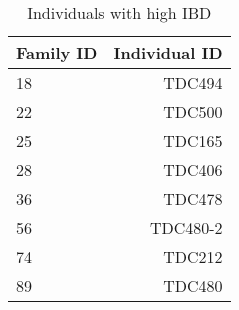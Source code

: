 \begin{table}[h]
\centering
\caption{Individuals with high IBD} 
\begin{tabular}{lr}
  \hline
Family ID & Individual ID \\ 
  \hline
18&TDC494 \\
22&TDC500 \\
25&TDC165 \\
28&TDC406 \\ 
36&TDC478 \\
56&TDC480-2 \\
74&TDC212 \\
89&TDC480 \\
   \hline
\end{tabular}
\end{table}